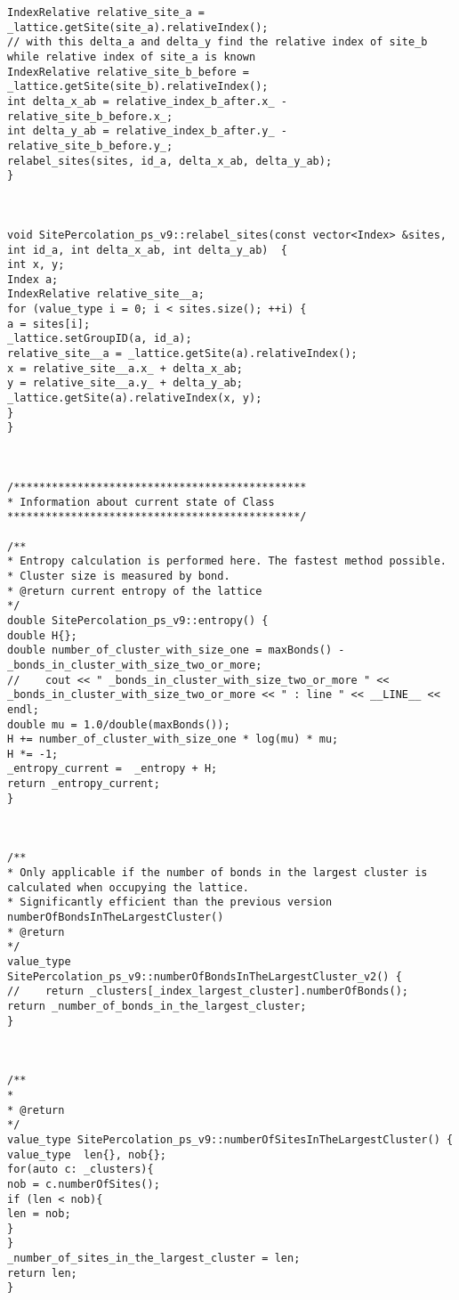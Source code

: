 \begin{lstlisting}[style=CStyle]
IndexRelative relative_site_a = _lattice.getSite(site_a).relativeIndex();
// with this delta_a and delta_y find the relative index of site_b while relative index of site_a is known
IndexRelative relative_site_b_before = _lattice.getSite(site_b).relativeIndex();
int delta_x_ab = relative_index_b_after.x_ - relative_site_b_before.x_;
int delta_y_ab = relative_index_b_after.y_ - relative_site_b_before.y_;
relabel_sites(sites, id_a, delta_x_ab, delta_y_ab);
}



void SitePercolation_ps_v9::relabel_sites(const vector<Index> &sites, int id_a, int delta_x_ab, int delta_y_ab)  {
int x, y;
Index a;
IndexRelative relative_site__a;
for (value_type i = 0; i < sites.size(); ++i) {
a = sites[i];
_lattice.setGroupID(a, id_a);
relative_site__a = _lattice.getSite(a).relativeIndex();
x = relative_site__a.x_ + delta_x_ab;
y = relative_site__a.y_ + delta_y_ab;
_lattice.getSite(a).relativeIndex(x, y);
}
}



/**********************************************
* Information about current state of Class
**********************************************/

/**
* Entropy calculation is performed here. The fastest method possible.
* Cluster size is measured by bond.
* @return current entropy of the lattice
*/
double SitePercolation_ps_v9::entropy() {
double H{};
double number_of_cluster_with_size_one = maxBonds() - _bonds_in_cluster_with_size_two_or_more;
//    cout << " _bonds_in_cluster_with_size_two_or_more " << _bonds_in_cluster_with_size_two_or_more << " : line " << __LINE__ << endl;
double mu = 1.0/double(maxBonds());
H += number_of_cluster_with_size_one * log(mu) * mu;
H *= -1;
_entropy_current =  _entropy + H;
return _entropy_current;
}



/**
* Only applicable if the number of bonds in the largest cluster is calculated when occupying the lattice.
* Significantly efficient than the previous version numberOfBondsInTheLargestCluster()
* @return
*/
value_type SitePercolation_ps_v9::numberOfBondsInTheLargestCluster_v2() {
//    return _clusters[_index_largest_cluster].numberOfBonds();
return _number_of_bonds_in_the_largest_cluster;
}



/**
*
* @return
*/
value_type SitePercolation_ps_v9::numberOfSitesInTheLargestCluster() {
value_type  len{}, nob{};
for(auto c: _clusters){
nob = c.numberOfSites();
if (len < nob){
len = nob;
}
}
_number_of_sites_in_the_largest_cluster = len;
return len;
}



\end{lstlisting}
